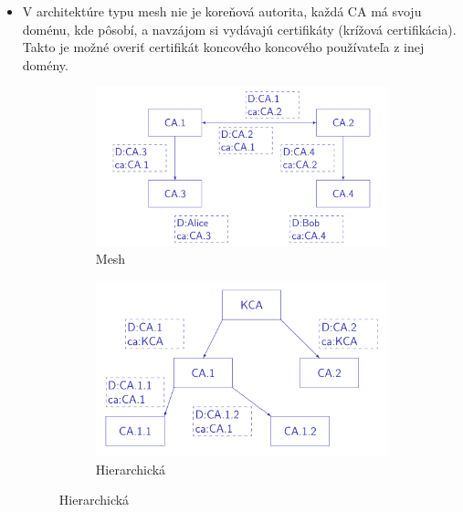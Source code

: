 \documentclass[12pt,a4paper]{article}
\begin{document}
{\begin{itemize}
\begin{figure}[htbp]
\begin{tikzpicture}[
              cert/.style={draw, rounded corners, minimum width=3.5cm, minimum height=1.5cm, align=center},
              arrow/.style={->, thick}
            ]
            \end{tikzpicture}
            \caption{Krok na certifikačnej ceste.}
            \label{fig:placeholder}
        \end{figure}
        \item V architektúre typu mesh nie je koreňová autorita, každá CA má svoju doménu, kde pôsobí, a navzájom si vydávajú certifikáty (krížová certifikácia). Takto je možné overiť certifikát koncového koncového používateľa z inej domény. 
        \begin{figure}[htbp]
            \centering
            \begin{subfigure}[b]{0.48\textwidth}
                \centering
                \includegraphics[width=\textwidth]{mesh_ca.png}
                \caption{Mesh}
                \label{fig:mesh}
            \end{subfigure}
            \begin{subfigure}[b]{0.48\textwidth}
                \centering
                \includegraphics[width=\textwidth]{root_ca.png}
                \caption{Hierarchická}

\end{subfigure}
\end{figure}
\end{itemize}}
\end{document}
